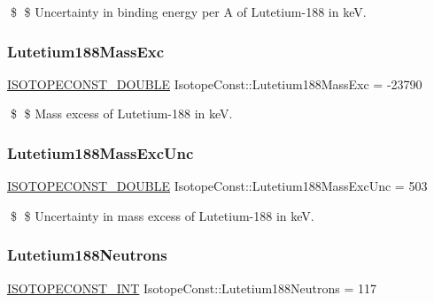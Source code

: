 \$ \$ Uncertainty in binding energy per A of Lutetium-\/188 in keV. \mbox{\label{group___isotope_const-_lutetium-_lu188_gaee071789ec16f038d02b1e80d3c6aef9}} 
\subsubsection{\texorpdfstring{Lutetium188\+Mass\+Exc}{Lutetium188MassExc}}
{\footnotesize\ttfamily \mbox{\hyperlink{group___isotope_const-_macros_ga8f45a7272ce02c0b4c65c44636ed719a}{I\+S\+O\+T\+O\+P\+E\+C\+O\+N\+S\+T\+\_\+\+D\+O\+U\+B\+LE}} Isotope\+Const\+::\+Lutetium188\+Mass\+Exc = -\/23790}

\$ \$ Mass excess of Lutetium-\/188 in keV. \mbox{\label{group___isotope_const-_lutetium-_lu188_ga4e46e8ae340a8f03c54ed760870dba3d}} 
\subsubsection{\texorpdfstring{Lutetium188\+Mass\+Exc\+Unc}{Lutetium188MassExcUnc}}
{\footnotesize\ttfamily \mbox{\hyperlink{group___isotope_const-_macros_ga8f45a7272ce02c0b4c65c44636ed719a}{I\+S\+O\+T\+O\+P\+E\+C\+O\+N\+S\+T\+\_\+\+D\+O\+U\+B\+LE}} Isotope\+Const\+::\+Lutetium188\+Mass\+Exc\+Unc = 503}

\$ \$ Uncertainty in mass excess of Lutetium-\/188 in keV. \mbox{\label{group___isotope_const-_lutetium-_lu188_gad990f8e37555808973894555413572a2}} 
\subsubsection{\texorpdfstring{Lutetium188\+Neutrons}{Lutetium188Neutrons}}
{\footnotesize\ttfamily \mbox{\hyperlink{group___isotope_const-_macros_ga5f18360b3e99483a35c32d789e62621c}{I\+S\+O\+T\+O\+P\+E\+C\+O\+N\+S\+T\+\_\+\+I\+NT}} Isotope\+Const\+::\+Lutetium188\+Neutrons = 117}

